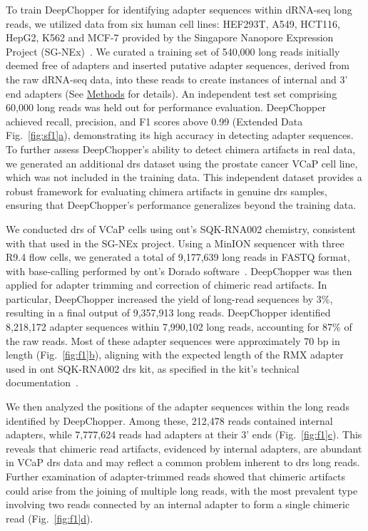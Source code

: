\documentclass[pdflatex,sn-nature, lineno]{sn-jnl}%
\newcommand{\figref}[2]{Fig.~\hyperref[#1]{\ref*{#1}#2}}
\newcommand{\edfigref}[2]{Extended Data Fig.~\hyperref[#1]{\ref*{#1}#2}}
\theoremstyle{thmstyleone}%
\theoremstyle{thmstyletwo}%
\theoremstyle{thmstylethree}%
\begin{document}
To train DeepChopper for identifying adapter sequences within dRNA-seq long reads, we utilized data from six human cell lines: HEF293T, A549, HCT116, HepG2, K562 and MCF-7 provided by the Singapore Nanopore Expression Project (SG-NEx)~\cite{chen2021systematic}.
We curated a training set of 540,000 long reads initially deemed free of adapters and inserted putative adapter sequences, derived from the raw dRNA-seq data, into these reads to create instances of internal and 3' end adapters (See \hyperref[sec:methods]{Methods} for details).
An independent test set comprising 60,000 long reads was held out for performance evaluation.
DeepChopper achieved recall, precision, and F1 scores above 0.99 (\edfigref{fig:sf1}{a}), demonstrating its high accuracy in detecting adapter sequences.
To further assess DeepChopper’s ability to detect chimera artifacts in real data, we generated an additional \gls{drs} dataset using the prostate cancer VCaP cell line, which was not included in the training data.
This independent dataset provides a robust framework for evaluating chimera artifacts in genuine \gls{drs} samples, ensuring that DeepChopper's performance generalizes beyond the training data. 

We conducted \gls{drs} of VCaP cells using \gls{ont}'s SQK-RNA002 chemistry, consistent with that used in the SG-NEx project.
Using a MinION sequencer with three R9.4 flow cells, we generated a total of 9,177,639 long reads in FASTQ format, with base-calling performed by \gls{ont}'s Dorado software~\cite{dorado2023}.
DeepChopper was then applied for adapter trimming and correction of chimeric read artifacts.
In particular, DeepChopper increased the yield of long-read sequences by 3\%, resulting in a final output of 9,357,913 long reads.
DeepChopper identified 8,218,172 adapter sequences within 7,990,102 long reads, accounting for 87\% of the raw reads. 
Most of these adapter sequences were approximately 70 bp in length (\figref{fig:f1}{b}), aligning with the expected length of the RMX adapter used in \gls{ont} SQK-RNA002 \gls{drs} kit, as specified in the kit's technical documentation~\cite{nano2017tech}.

We then analyzed the positions of the adapter sequences within the long reads identified by DeepChopper.
Among these, 212,478 reads contained internal adapters, while 7,777,624 reads had adapters at their 3' ends (\figref{fig:f1}{c}).
This reveals that chimeric read artifacts, evidenced by internal adapters, are abundant in VCaP \gls{drs} data and may reflect a common problem inherent to \gls{drs} long reads.
Further examination of adapter-trimmed reads showed that chimeric artifacts could arise from the joining of multiple long reads, with the most prevalent type involving two reads connected by an internal adapter to form a single chimeric read (\figref{fig:f1}{d}).
\end{document}
